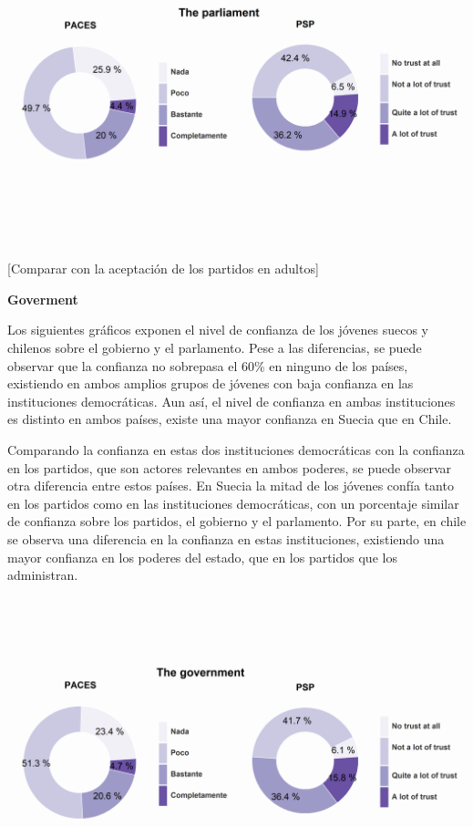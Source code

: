 \documentclass[12pt,twoside]{templates/facsothesis}
\begin{document}
\includegraphics{output/plotru2.png}

{[}Comparar con la aceptación de los partidos en adultos{]}

\textbf{Goverment}

Los siguientes gráficos exponen el nivel de confianza de los jóvenes suecos y chilenos sobre el gobierno y el parlamento. Pese a las diferencias, se puede observar que la confianza no sobrepasa el 60\% en ninguno de los países, existiendo en ambos amplios grupos de jóvenes con baja confianza en las instituciones democráticas. Aun así, el nivel de confianza en ambas instituciones es distinto en ambos países, existe una mayor confianza en Suecia que en Chile.

Comparando la confianza en estas dos instituciones democráticas con la confianza en los partidos, que son actores relevantes en ambos poderes, se puede observar otra diferencia entre estos países. En Suecia la mitad de los jóvenes confía tanto en los partidos como en las instituciones democráticas, con un porcentaje similar de confianza sobre los partidos, el gobierno y el parlamento. Por su parte, en chile se observa una diferencia en la confianza en estas instituciones, existiendo una mayor confianza en los poderes del estado, que en los partidos que los administran.

\includegraphics{output/plotru.png}
\end{document}
